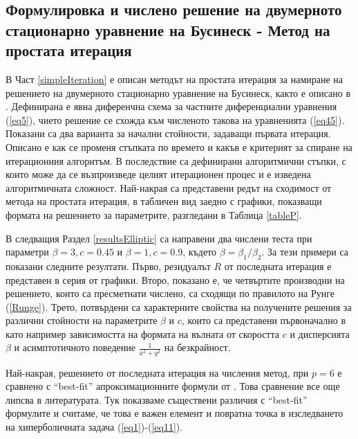 \documentclass[a4paper]{article}
\newcommand{\rf}[1]{(\ref{#1})}
\theoremstyle{remark}
\begin{document}
\begin{large}
\newpage
\section{Формулировка и числено решение на двумерното стационарно уравнение на Бусинеск - Метод на простата итерация}\label{ellipticFormulation}
В Част \ref{simpleIteration} е описан методът на простата итерация за намиране на решението на двумерното стационарно уравнение на Бусинеск, както е описано в \cite{ref16}. Дефинирана е явна диференчна схема за частните диференциални уравнения \rf{eq5}, чието решение се схожда към численото такова на уравненията \rf{eq45}. Показани са два варианта за начални стойности, задаващи първата итерация. Описано е как се променя стъпката по времето и какъв е критерият за спиране на итерационния алгоритъм. В последствие са дефинирани алгоритмични стъпки, с които може да се възпроизведе целият итерационен процес и е изведена алгоритмичната сложност. Най-накрая са представени редът на сходимост от метода на простата итерация, в табличен вид заедно с графики, показващи формата на решението за параметрите, разгледани в Таблица \ref{tableP}. 

В следващия Раздел \ref{resultsElliptic} са направени два числени теста при параметри $\beta = 3, c=0.45$ и $\beta = 1, c=0.9$, където $\beta = \beta_1/\beta_2$. За тези примери са показани следните резултати. Първо, резидуалът $R$ от последната итерация е представен в серия от графики. Второ, показано е, че четвъртите производни на решението, които са пресметнати числено, са сходящи по правилото на Рунге \rf{Runge}. Трето,  потвърдени са характерните свойства на получените решения за различни стойности на параметрите $\beta$ и $c$, които са представени първоначално в \cite{ref117,ref116} като например зависимостта на формата на вълната от скоростта $c$ и дисперсията $\beta$ и асимптотичното поведение $\frac{1}{x^2 + y^2}$ на безкрайност. 

Най-накрая, решението от последната итерация на числения метод, при $p=6$ е сравнено с ``best-fit'' апроксимационните формули от \cite{ref15}. Това сравнение все още липсва в литературата. Тук показваме съществени различия с ``best-fit'' формулите и считаме, че това е важен елемент и повратна точка в изследването на хиперболичната задача \rf{eq1}-\rf{eq11}. 


\end{large}
\end{document}
